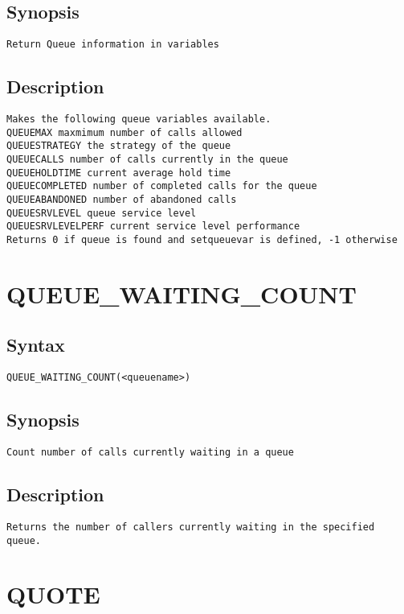 \subsection{Synopsis}
\begin{verbatim}
Return Queue information in variables
\end{verbatim}
\subsection{Description}
\begin{verbatim}
Makes the following queue variables available.
QUEUEMAX maxmimum number of calls allowed
QUEUESTRATEGY the strategy of the queue
QUEUECALLS number of calls currently in the queue
QUEUEHOLDTIME current average hold time
QUEUECOMPLETED number of completed calls for the queue
QUEUEABANDONED number of abandoned calls
QUEUESRVLEVEL queue service level
QUEUESRVLEVELPERF current service level performance
Returns 0 if queue is found and setqueuevar is defined, -1 otherwise
\end{verbatim}


\section{QUEUE\_WAITING\_COUNT}
\subsection{Syntax}
\begin{verbatim}
QUEUE_WAITING_COUNT(<queuename>)
\end{verbatim}
\subsection{Synopsis}
\begin{verbatim}
Count number of calls currently waiting in a queue
\end{verbatim}
\subsection{Description}
\begin{verbatim}
Returns the number of callers currently waiting in the specified queue.

\end{verbatim}


\section{QUOTE}
